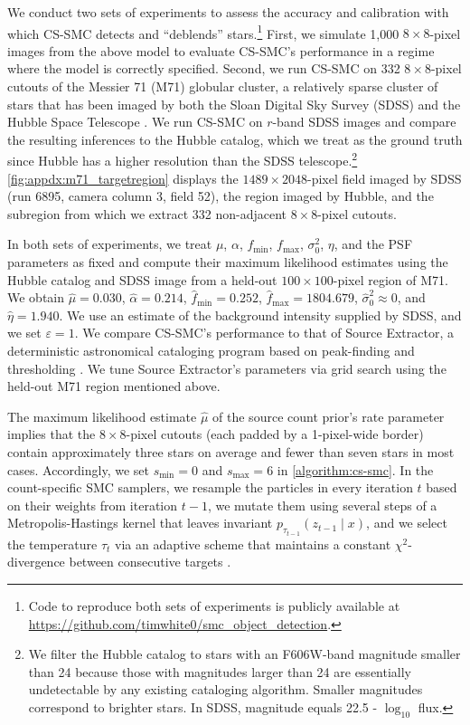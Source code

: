 \documentclass[
  12pt]{article}
\begin{document}
We conduct two sets of experiments to assess the accuracy and calibration with which CS-SMC detects and ``deblends'' stars.\footnote{Code to reproduce both sets of experiments is publicly available at \url{https://github.com/timwhite0/smc\_object\_detection}.} First, we simulate 1,000 $8{\times}8$-pixel images from the above model to evaluate CS-SMC's performance in a regime where the model is correctly specified. Second, we run CS-SMC on 332 $8{\times}8$-pixel cutouts of the Messier 71 (M71) globular cluster, a relatively sparse cluster of stars that has been imaged by both the Sloan Digital Sky Survey (SDSS) and the Hubble Space Telescope \citep{sarajedini2007acs, an2008galactic}. We run CS-SMC on $r$-band SDSS images and compare the resulting inferences to the Hubble catalog, which we treat as the ground truth since Hubble has a higher resolution than the SDSS telescope.\footnote{We filter the Hubble catalog to stars with an F606W-band magnitude smaller than 24 because those with magnitudes larger than 24 are essentially undetectable by any existing cataloging algorithm. Smaller magnitudes correspond to brighter stars. In SDSS, magnitude equals 22.5 - $\log_{10}$ flux.} \autoref{fig:appdx:m71_targetregion} displays the $1489{\times}2048$-pixel field imaged by SDSS (run 6895, camera column 3, field 52), the region imaged by Hubble, and the subregion from which we extract 332 non-adjacent $8{\times}8$-pixel cutouts.

In both sets of experiments, we treat $\mu$, $\alpha$, $f_{\min}$, $f_{\max}$, $\sigma_0^2$, $\eta$, and the PSF parameters as fixed and compute their maximum likelihood estimates using the Hubble catalog and SDSS image from a held-out $100{\times}100$-pixel region of M71. We obtain $\widehat{\mu} = 0.030$, $\widehat{\alpha} = 0.214$, $\widehat{f}_{\min} = 0.252$, $\widehat{f}_{\max} = 1804.679$, $\widehat{\sigma}_0^2 \approx 0$, and $\widehat{\eta} = 1.940$. We use an estimate of the background intensity supplied by SDSS, and we set $\varepsilon=1$. We compare CS-SMC's performance to that of Source Extractor, a deterministic astronomical cataloging program based on peak-finding and thresholding \citep{bertin1996sextractor, barbary2016sep}. We tune Source Extractor's parameters via grid search using the held-out M71 region mentioned above.

The maximum likelihood estimate $\widehat{\mu}$ of the source count prior's rate parameter implies that the $8{\times}8$-pixel cutouts (each padded by a 1-pixel-wide border) contain approximately three stars on average and fewer than seven stars in most cases. Accordingly, we set $s_{\min} = 0$ and $s_{\max} = 6$ in \autoref{algorithm:cs-smc}. In the count-specific SMC samplers, we resample the particles in every iteration $t$ based on their weights from iteration $t{-}1$, we mutate them using several steps of a Metropolis-Hastings kernel that leaves invariant $p_{\tau_{t-1}}(z_{t-1} \mid x)$, and we select the temperature $\tau_t$ via an adaptive scheme that maintains a constant $\chi^2$-divergence between consecutive targets \citep{chopin2020}.
\end{document}
